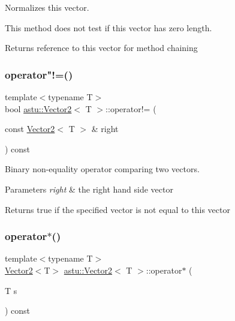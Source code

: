 Normalizes this vector.

This method does not test if this vector has zero length.

\begin{DoxyReturn}{Returns}
reference to this vector for method chaining 
\end{DoxyReturn}
\mbox{\label{classastu_1_1Vector2_a01b57021e1b027997ecefb3c9b3595d9}} 
\subsubsection{\texorpdfstring{operator"!=()}{operator!=()}}
{\footnotesize\ttfamily template$<$typename T$>$ \\
bool \hyperlink{classastu_1_1Vector2}{astu\+::\+Vector2}$<$ T $>$\+::operator!= (\begin{DoxyParamCaption}\item[{const \hyperlink{classastu_1_1Vector2}{Vector2}$<$ T $>$ \&}]{right }\end{DoxyParamCaption}) const\hspace{0.3cm}{\ttfamily [inline]}}

Binary non-\/equality operator comparing two vectors.


\begin{DoxyParams}{Parameters}
{\em right} & the right hand side vector \\
\hline
\end{DoxyParams}
\begin{DoxyReturn}{Returns}
{\ttfamily true} if the specified vector is not equal to this vector 
\end{DoxyReturn}
\mbox{\label{classastu_1_1Vector2_aa9cd4d74e0174cb0995613f989e42f12}} 
\subsubsection{\texorpdfstring{operator$\ast$()}{operator*()}}
{\footnotesize\ttfamily template$<$typename T$>$ \\
\hyperlink{classastu_1_1Vector2}{Vector2}$<$T$>$ \hyperlink{classastu_1_1Vector2}{astu\+::\+Vector2}$<$ T $>$\+::operator$\ast$ (\begin{DoxyParamCaption}\item[{T}]{s }\end{DoxyParamCaption}) const\hspace{0.3cm}{\ttfamily [inline]}}

